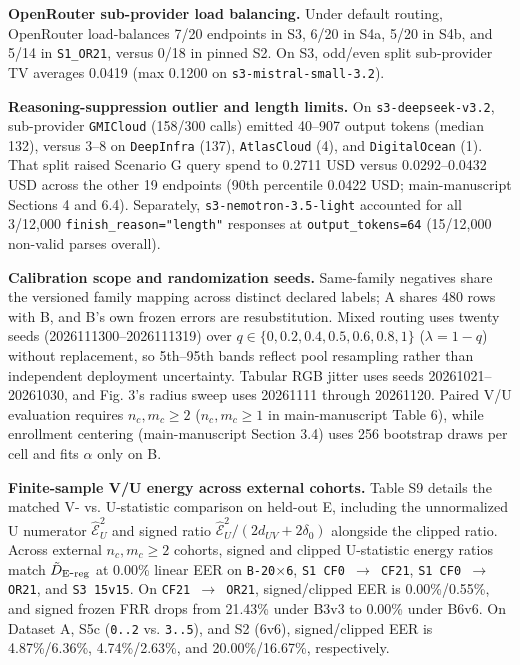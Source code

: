 \textbf{OpenRouter sub-provider load balancing.} Under default routing, OpenRouter load-balances 7/20 endpoints in S3, 6/20 in S4a, 5/20 in S4b, and 5/14 in \texttt{S1\_\allowbreak{}OR21}, versus 0/18 in pinned S2. On S3, odd/even split sub-provider TV averages 0.0419 (max 0.1200 on \texttt{s3-\allowbreak{}mistral-\allowbreak{}small-\allowbreak{}3.\allowbreak{}2}).


\textbf{Reasoning-suppression outlier and length limits.} On \texttt{s3-\allowbreak{}deepseek-\allowbreak{}v3.\allowbreak{}2}, sub-provider \texttt{GMICloud} (158/300 calls) emitted 40--907 output tokens (median 132), versus 3--8 on \texttt{DeepInfra} (137), \texttt{AtlasCloud} (4), and \texttt{DigitalOcean} (1). That split raised Scenario G query spend to 0.2711 USD versus 0.0292--0.0432 USD across the other 19 endpoints (90th percentile 0.0422 USD; main-manuscript Sections 4 and 6.4). Separately, \texttt{s3-\allowbreak{}nemotron-\allowbreak{}3.\allowbreak{}5-\allowbreak{}light} accounted for all 3/12,000 \texttt{finish\_\allowbreak{}reason=\allowbreak{}"length"} responses at \texttt{output\_\allowbreak{}tokens=\allowbreak{}64} (15/12,000 non-valid parses overall).


\textbf{Calibration scope and randomization seeds.} Same-family negatives share the versioned family mapping across distinct declared labels; A shares 480 rows with B, and B's own frozen errors are resubstitution. Mixed routing uses twenty seeds (2026111300--2026111319) over $q \in \{0, 0.2, 0.4, 0.5, 0.6, 0.8, 1\}$ ($\lambda = 1 - q$) without replacement, so 5th--95th bands reflect pool resampling rather than independent deployment uncertainty. Tabular RGB jitter uses seeds 20261021--20261030, and Fig. 3's radius sweep uses 20261111 through 20261120. Paired V/U evaluation requires $n_c, m_c \ge 2$ ($n_c, m_c \ge 1$ in main-manuscript Table 6), while enrollment centering (main-manuscript Section 3.4) uses 256 bootstrap draws per cell and fits $\alpha$ only on B.


\textbf{Finite-sample V/U energy across external cohorts.} Table S9 details the matched V- vs. U-statistic comparison on held-out E, including the unnormalized U numerator $\widehat{\mathcal E}_U^2$ and signed ratio $\widehat{\mathcal E}_U^2/(2d_{UV}+2\delta_0)$ alongside the clipped ratio. Across external $n_c, m_c \ge 2$ cohorts, signed and clipped U-statistic energy ratios match $\tilde D_{\mathrm{E\mbox{-}reg}}{}$ at 0.00\% linear EER on \texttt{B-\allowbreak{}20\ensuremath{\times}6}, \texttt{S1 CF0 \ensuremath{\rightarrow} CF21}, \texttt{S1 CF0 \ensuremath{\rightarrow} OR21}, and \texttt{S3 15v15}. On \texttt{CF21 \ensuremath{\rightarrow} OR21}, signed/clipped EER is 0.00\%/0.55\%, and signed frozen FRR drops from 21.43\% under B3v3 to 0.00\% under B6v6. On Dataset A, S5c (\texttt{0.\allowbreak{}.\allowbreak{}2} vs. \texttt{3.\allowbreak{}.\allowbreak{}5}), and S2 (6v6), signed/clipped EER is 4.87\%/6.36\%, 4.74\%/2.63\%, and 20.00\%/16.67\%, respectively.


